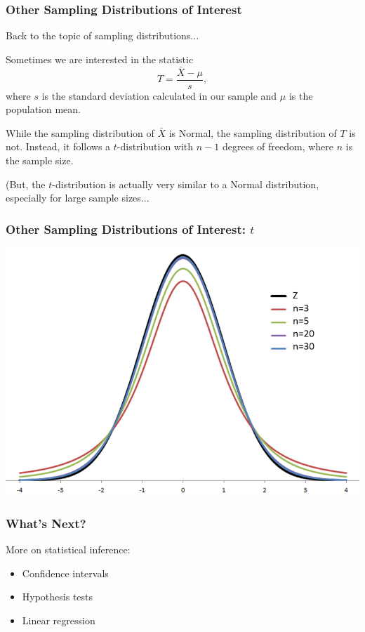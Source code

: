 \documentclass[12pt, 
hyperref={colorlinks=true, linkcolor=blue, urlcolor=cyan}]{beamer}
\begin{document}
\begin{frame}
\frametitle{Other Sampling Distributions of Interest}

Back to the topic of sampling distributions...

Sometimes we are interested in the statistic $$T = \frac{\bar{X}-\mu}{s},$$ where $s$ is the standard deviation calculated in our sample and $\mu$ is the population mean. 

While the sampling distribution of $\bar{X}$ is Normal, the sampling distribution of $T$ is not. Instead, it follows a $t$-distribution with $n-1$ degrees of freedom, where $n$ is the sample size.

(But, the $t$-distribution is actually very similar to a Normal distribution, especially for large sample sizes...

\end{frame}

\begin{frame}
\frametitle{Other Sampling Distributions of Interest: $t$}

\center \includegraphics[height=0.8\textheight]{./t-normal}

\end{frame}


\begin{frame}
\frametitle{What's Next?}

More on statistical inference:
\begin{itemize}
\item Confidence intervals
\item Hypothesis tests
\item Linear regression
\end{itemize}

\end{frame}
\end{document}
